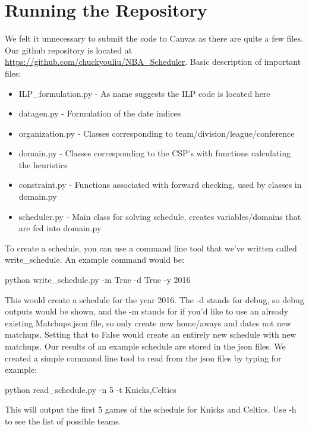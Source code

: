 \documentclass{article}
\begin{document}
	\section{Running the Repository}
	We felt it unnecessary to submit the code to Canvas as there are quite a few files. Our github repository is located at \url{https://github.com/chuckyouliu/NBA_Scheduler}. Basic description of important files:

	\begin{itemize}
		\item ILP\_formulation.py - As name suggests the ILP code is located here
		\item datagen.py - Formulation of the date indices
		\item organization.py - Classes corresponding to team/division/league/conference
		\item domain.py - Classes corresponding to the CSP's with functions calculating the heuristics
		\item constraint.py - Functions associated with forward checking, used by classes in domain.py
		\item scheduler.py - Main class for solving schedule, creates variables/domains that are fed into domain.py
	\end{itemize}
	To create a schedule, you can use a command line tool that we've written called write\_schedule. An example command would be:
	\begin{center}
		python write\_schedule.py -m True -d True -y 2016
	\end{center}
	This would create a schedule for the year 2016. The -d stands for debug, so debug outputs would be shown, and the -m stands for if you'd like to use an already existing Matchups.json file, so only create new home/aways and dates not new matchups. Setting that to False would create an entirely new schedule with new matchups.
	Our results of an example schedule are stored in the json files. We created a simple command line tool to read from the json files by typing for example:
	\begin{center}
		python read\_schedule.py -n 5 -t Knicks,Celtics
	\end{center}
	This will output the first 5 games of the schedule for Knicks and Celtics. Use -h to see the list of possible teams.
\end{document}
